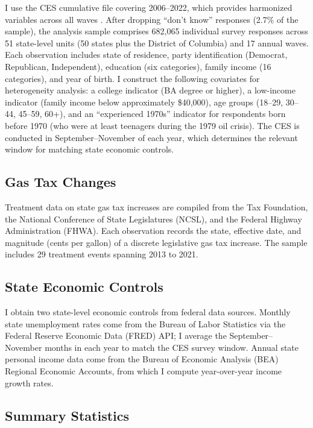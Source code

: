\documentclass[12pt]{article}
\begin{document}
I use the CES cumulative file covering 2006--2022, which provides harmonized variables across all waves \citep{schaffner2023cooperative}. After dropping ``don't know'' responses (2.7\% of the sample), the analysis sample comprises 682,065 individual survey responses across 51 state-level units (50 states plus the District of Columbia) and 17 annual waves. Each observation includes state of residence, party identification (Democrat, Republican, Independent), education (six categories), family income (16 categories), and year of birth. I construct the following covariates for heterogeneity analysis: a college indicator (BA degree or higher), a low-income indicator (family income below approximately \$40,000), age groups (18--29, 30--44, 45--59, 60+), and an ``experienced 1970s'' indicator for respondents born before 1970 (who were at least teenagers during the 1979 oil crisis). The CES is conducted in September--November of each year, which determines the relevant window for matching state economic controls.

\subsection{Gas Tax Changes}

Treatment data on state gas tax increases are compiled from the Tax Foundation, the National Conference of State Legislatures (NCSL), and the Federal Highway Administration (FHWA). Each observation records the state, effective date, and magnitude (cents per gallon) of a discrete legislative gas tax increase. The sample includes 29 treatment events spanning 2013 to 2021.

\subsection{State Economic Controls}

I obtain two state-level economic controls from federal data sources. Monthly state unemployment rates come from the Bureau of Labor Statistics via the Federal Reserve Economic Data (FRED) API; I average the September--November months in each year to match the CES survey window. Annual state personal income data come from the Bureau of Economic Analysis (BEA) Regional Economic Accounts, from which I compute year-over-year income growth rates.

\subsection{Summary Statistics}
\end{document}
